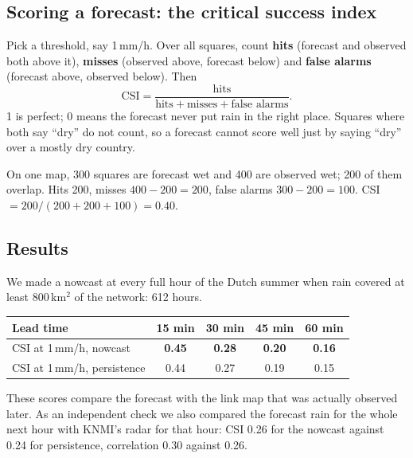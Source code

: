 \subsection{Scoring a forecast: the critical success index}
Pick a threshold, say 1\,mm/h. Over all squares, count \textbf{hits} (forecast and observed both above it), \textbf{misses}
(observed above, forecast below) and \textbf{false alarms} (forecast above, observed below). Then
\[
\text{CSI} = \frac{\text{hits}}{\text{hits} + \text{misses} + \text{false alarms}} .
\]
1 is perfect; 0 means the forecast never put rain in the right place. Squares where both say ``dry'' do not count, so a
forecast cannot score well just by saying ``dry'' over a mostly dry country.

\begin{example}[: CSI]
On one map, 300 squares are forecast wet and 400 are observed wet; 200 of them overlap. Hits 200, misses
$400-200 = 200$, false alarms $300-200 = 100$. CSI $= 200 / (200+200+100) = 0.40$.
\end{example}

\subsection{Results}
We made a nowcast at every full hour of the Dutch summer when rain covered at least 800\,km$^2$ of the network: 612 hours.
\begin{center}
\end{center}
\begin{center}\small
\begin{tabular}{lcccc}
\toprule
Lead time & 15 min & 30 min & 45 min & 60 min\\
\midrule
CSI at 1\,mm/h, nowcast & \textbf{0.45} & \textbf{0.28} & \textbf{0.20} & \textbf{0.16}\\
CSI at 1\,mm/h, persistence & 0.44 & 0.27 & 0.19 & 0.15\\
\bottomrule
\end{tabular}
\end{center}
These scores compare the forecast with the link map that was actually observed later. As an independent check we also
compared the forecast rain for the whole next hour with KNMI's radar for that hour: CSI 0.26 for the nowcast against 0.24
for persistence, correlation 0.30 against 0.26.

